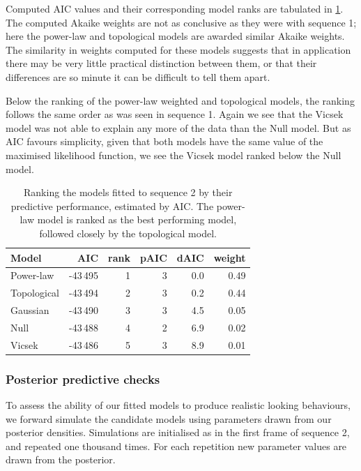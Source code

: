 Computed AIC values and their corresponding model ranks are tabulated in
\cref{tab:aic_seq2}. The computed Akaike weights are not as conclusive as they
were with sequence 1; here the power-law and topological models are awarded
similar Akaike weights. The similarity in weights computed for these models
suggests that in application there may be very little practical distinction
between them, or that their differences are so minute it can be difficult to
tell them apart.

Below the ranking of the power-law weighted and topological models, the ranking
follows the same order as was seen in sequence 1. Again we see that the
Vicsek model was not able to explain any more of the data than the Null model.
But as AIC favours simplicity, given that both models have the same value of
the maximised likelihood function, we see the Vicsek model ranked below the
Null model.

\begin{table}[tbp]
\begin{tabular}{@{}lrrrrr@{}}
\toprule
Model                       &        AIC & rank & pAIC & dAIC & weight \\
\midrule
Power-law                   & -43\,495 &    1 &  3 &  0.0 &   0.49 \\
Topological                 & -43\,494 &    2 &  3 &  0.2 &   0.44 \\
Gaussian                    & -43\,490 &    3 &  3 &  4.5 &   0.05 \\
Null                        & -43\,488 &    4 &  2 &  6.9 &   0.02 \\
Vicsek                      & -43\,486 &    5 &  3 &  8.9 &   0.01 \\
\bottomrule
\end{tabular}
\caption{Ranking the models fitted to sequence 2 by their predictive
  performance, estimated by AIC. The power-law model is ranked as the best
  performing model, followed closely by the topological model.}
\label{tab:aic_seq2}
\end{table}

\subsubsection{Posterior predictive checks}

To assess the ability of our fitted models to produce realistic looking
behaviours, we forward simulate the candidate models using parameters drawn
from our posterior densities. Simulations are initialised as in the first frame
of sequence 2, and repeated one thousand times. For each repetition new
parameter values are drawn from the posterior.

